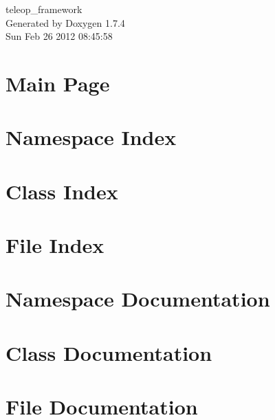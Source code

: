 \documentclass[a4paper]{book}
\begin{document}
\begin{titlepage}
\vspace*{7cm}
\begin{center}
{\Large teleop\_\-framework }\\
\vspace*{1cm}
{\large Generated by Doxygen 1.7.4}\\
\vspace*{0.5cm}
{\small Sun Feb 26 2012 08:45:58}\\
\end{center}
\end{titlepage}
\clearemptydoublepage
{}
\tableofcontents
\clearemptydoublepage
{}
\chapter{Main Page}
\label{index}
\chapter{Namespace Index}

\chapter{Class Index}

\chapter{File Index}

\chapter{Namespace Documentation}

\chapter{Class Documentation}






\chapter{File Documentation}






\printindex
\end{document}
